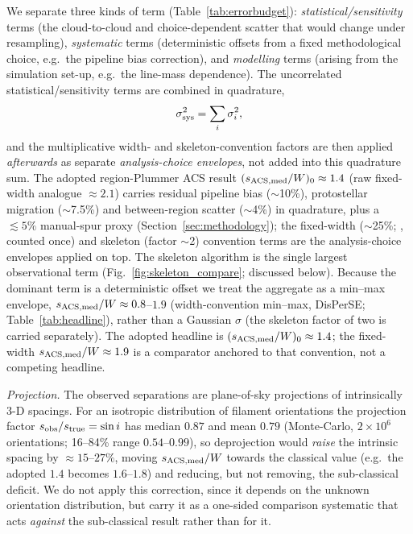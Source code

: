 \documentclass[usenatbib,twoside,twocolumn]{mnras}
\begin{document}
We separate three kinds of term (Table~\ref{tab:errorbudget}): \emph{statistical/sensitivity} terms (the cloud-to-cloud and choice-dependent scatter that would change under resampling), \emph{systematic} terms (deterministic offsets from a fixed methodological choice, e.g.\ the pipeline bias correction), and \emph{modelling} terms (arising from the simulation set-up, e.g.\ the line-mass dependence). The uncorrelated statistical/sensitivity terms are combined in quadrature,
\begin{equation}
\sigma_{\rm sys}^2=\sum_i\sigma_i^2,
\label{eq:quadrature}
\end{equation}
and the multiplicative width- and skeleton-convention factors are then applied \emph{afterwards} as separate \emph{analysis-choice envelopes}, not added into this quadrature sum. The adopted region-Plummer ACS result $(s_{\rm ACS,med}/W)_0\approx1.4$ (raw fixed-width analogue $\approx2.1$) carries residual pipeline bias ($\sim$10\%), protostellar migration ($\sim$7.5\%) and between-region scatter ($\sim$4\%) in quadrature, plus a $\lesssim5\%$ manual-spur proxy (Section~\ref{sec:methodology}); the fixed-width ($\sim$25\%; \citealt{Panopoulou2022}, counted once) and skeleton (factor $\sim$2) convention terms are the analysis-choice envelopes applied on top. The skeleton algorithm is the single largest observational term (Fig.~\ref{fig:skeleton_compare}; discussed below). Because the dominant term is a deterministic offset we treat the aggregate as a min--max envelope, $s_{\rm ACS,med}/W\approx0.8$--$1.9$ (width-convention min--max, DisPerSE; Table~\ref{tab:headline}), rather than a Gaussian $\sigma$ (the skeleton factor of two is carried separately). The adopted headline is $(s_{\rm ACS,med}/W)_0\approx1.4$; the fixed-width $s_{\rm ACS,med}/W\approx1.9$ is a comparator anchored to that convention, not a competing headline.

\emph{Projection.} The observed separations are plane-of-sky projections of intrinsically 3-D spacings. For an isotropic distribution of filament orientations the projection factor $s_{\rm obs}/s_{\rm true}=\sin i$ has median $0.87$ and mean $0.79$ (Monte-Carlo, $2\times10^6$ orientations; 16--84\% range $0.54$--$0.99$), so deprojection would \emph{raise} the intrinsic spacing by $\approx15$--$27\%$, moving $s_{\rm ACS,med}/W$ towards the classical value (e.g.\ the adopted $1.4$ becomes $1.6$--$1.8$) and reducing, but not removing, the sub-classical deficit. We do not apply this correction, since it depends on the unknown orientation distribution, but carry it as a one-sided comparison systematic that acts \emph{against} the sub-classical result rather than for it.
\end{document}
